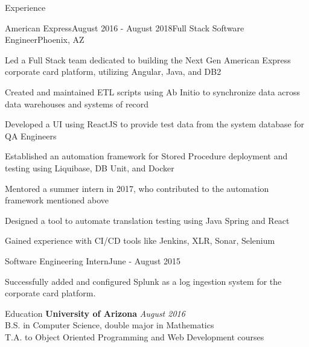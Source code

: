 \documentclass{resume} %
\begin{document}
\begin{rSection}{Experience}
\begin{rSubsection}{American Express}{August 2016 - August 2018}{Full Stack Software Engineer}{Phoenix, AZ}	
\item Led a Full Stack team dedicated to building the Next Gen American Express corporate card platform, utilizing Angular, Java, and DB2
\item Created and maintained ETL scripts using Ab Initio to synchronize data across data warehouses and systems of record
\item Developed a UI using ReactJS to provide test data from the system database for QA Engineers
\item Established an automation framework for Stored Procedure deployment and testing using Liquibase, DB Unit, and Docker
\item Mentored a summer intern in 2017, who contributed to the automation framework mentioned above
\item Designed a tool to automate translation testing using Java Spring and React
\item Gained experience with CI/CD tools like Jenkins, XLR, Sonar, Selenium
\end{rSubsection}

\begin{rSmallSubsection}{Software Engineering Intern}{June - August 2015}
\item Successfully added and configured Splunk as a log ingestion system for the corporate card platform.
\end{rSmallSubsection}

\end{rSection}

\begin{rSection}{Education}
	{\bf\large University of Arizona} \hfill {\em\large August 2016} \\
	\large B.S. in Computer Science, double major in Mathematics \\
	\smallskip T.A. to Object Oriented Programming and Web Development courses
\end{rSection}
\end{document}
